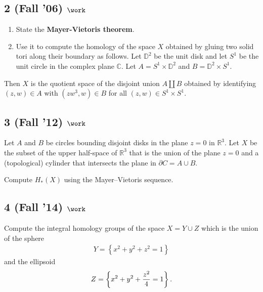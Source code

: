 \hypertarget{fall-06-work-1}{%
\subsection{\texorpdfstring{2 (Fall '06)
\(\work\)}{2 (Fall '06) \textbackslash work}}\label{fall-06-work-1}}

\begin{enumerate}
\def\labelenumi{\alph{enumi}.}
\item
  State the \textbf{Mayer-Vietoris theorem}.
\item
  Use it to compute the homology of the space \(X\) obtained by gluing
  two solid tori along their boundary as follows. Let \({\mathbb{D}}^2\)
  be the unit disk and let \(S^1\) be the unit circle in the complex
  plane \({\mathbb{C}}\). Let \(A = S^1 \times {\mathbb{D}}^2\) and
  \(B = {\mathbb{D}}^2 \times S^1\).
\end{enumerate}

Then \(X\) is the quotient space of the disjoint union \(A {\coprod}B\)
obtained by identifying \((z, w) \in A\) with \((zw^3 , w) \in B\) for
all \((z, w) \in S^1 \times S^1\).

\hypertarget{fall-12-work-2}{%
\subsection{\texorpdfstring{3 (Fall '12)
\(\work\)}{3 (Fall '12) \textbackslash work}}\label{fall-12-work-2}}

Let \(A\) and \(B\) be circles bounding disjoint disks in the plane
\(z = 0\) in \({\mathbb{R}}^3\). Let \(X\) be the subset of the upper
half-space of \({\mathbb{R}}^3\) that is the union of the plane
\(z = 0\) and a (topological) cylinder that intersects the plane in
\(\partial C = A \cup B\).

Compute \(H_* (X)\) using the Mayer--Vietoris sequence.

\hypertarget{fall-14-work-3}{%
\subsection{\texorpdfstring{4 (Fall '14)
\(\work\)}{4 (Fall '14) \textbackslash work}}\label{fall-14-work-3}}

Compute the integral homology groups of the space \(X = Y \cup Z\) which
is the union of the sphere
\begin{align*}
Y = \left\{{x^2 + y^2 + z^2 = 1}\right\}
\end{align*}
and the ellipsoid
\begin{align*}
Z =  \left\{{x^2 + y^2 + {z^2 \over 4} = 1}\right\}
.\end{align*}

